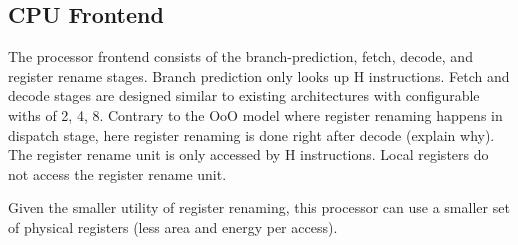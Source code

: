 \subsection{CPU Frontend}
\label{sec:cpu_frontend}

The processor frontend consists of the branch-prediction, fetch, decode, and
register rename stages. Branch prediction only looks up H instructions. Fetch
and decode stages are designed similar to existing architectures with
configurable withs of 2, 4, 8. Contrary to the OoO model where register renaming
happens in dispatch stage, here register renaming is done right after decode
(explain why).  The register rename unit is only accessed by H instructions.
Local registers do not access the register rename unit.

Given the smaller utility of register renaming, this processor can use a
smaller set of physical registers (less area and energy per access).

